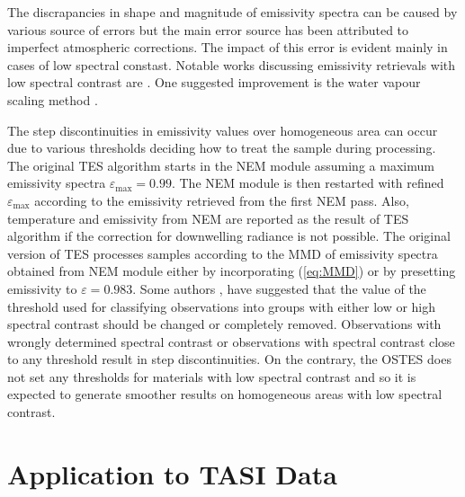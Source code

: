 The discrapancies in shape and magnitude of emissivity spectra can be caused by various source of errors but the main error source has been attributed to imperfect atmospheric corrections. The impact of this error is evident mainly in cases of low spectral constast. Notable works discussing emissivity retrievals with low spectral contrast are \cite{tonooka_verification_2001, tonooka_validation_2005, tonooka_vicarious_2005, coll_temperature_2007, sobrino_accuracy_2007}. One suggested improvement is the water vapour scaling method \cite{tonooka_accurate_2005, gillespie_residual_2011}.

The step discontinuities in emissivity values over homogeneous area can occur due to various thresholds deciding how to treat the sample during processing. The original TES algorithm starts in the NEM module assuming a maximum emissivity spectra $\varepsilon_\mathrm{max}=0.99$. The NEM module is then restarted with refined $\varepsilon_\mathrm{max}$ according to the emissivity retrieved from the first NEM pass. Also,	 temperature and emissivity from NEM are reported as the result of TES algorithm if the correction for downwelling radiance is not possible. The original version of TES processes samples according to the MMD of emissivity spectra obtained from NEM module either by incorporating (\ref{eq:MMD}) or by presetting emissivity to $\varepsilon = 0.983$. Some authors \cite{gustafson_revisions_2006}, \cite{sabol_field_2009} have suggested that the value of the threshold used for classifying observations into groups with either low or high spectral contrast should be changed or completely removed. Observations with wrongly determined spectral contrast or observations with spectral contrast close to any threshold result in step discontinuities. On the contrary, the OSTES does not set any thresholds for materials with low spectral contrast and so it is expected to generate smoother results on homogeneous areas with low spectral contrast.

\section{Application to TASI Data}
